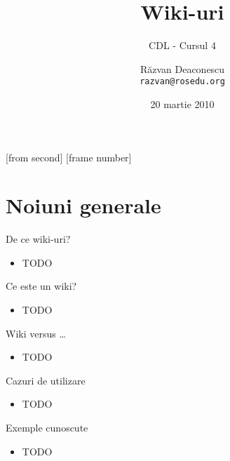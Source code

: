 \documentclass{beamer}
\title[Wiki-uri]{Wiki-uri}
\subtitle{CDL - Cursul 4}
\institute[ROSEdu]{ROSEdu}
\date{20 martie 2010}
\author{Răzvan Deaconescu \\ \texttt{razvan@rosedu.org}}
\begin{document}
[from second]
[frame number]

\frame{\titlepage}

\frame{\tableofcontents}


\section{Noiuni generale}

\frame{\tableofcontents[currentsection]}


\begin{frame}{De ce wiki-uri?}
  \begin{itemize}
    \item TODO
  \end{itemize}
\end{frame}

\begin{frame}{Ce este un wiki?}
  \begin{itemize}
    \item TODO
  \end{itemize}
\end{frame}

\begin{frame}{Wiki versus \ldots}
  \begin{itemize}
    \item TODO
  \end{itemize}
\end{frame}

\begin{frame}{Cazuri de utilizare}
  \begin{itemize}
    \item TODO
  \end{itemize}
\end{frame}

\begin{frame}{Exemple cunoscute}
  \begin{itemize}
    \item TODO
  \end{itemize}
\end{frame}
\end{document}
